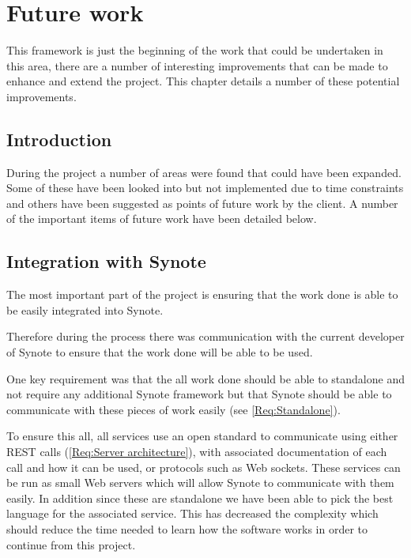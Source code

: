 \chapter{Future work} \label{Chapter: Future Work}

\begin{preamble}
This framework is just the beginning of the work that could be undertaken in this area, there are a number of interesting improvements that can be made to enhance and extend the project. This chapter details a number of these potential improvements.
\end{preamble}

\section{Introduction}

During the project a number of areas were found that could have been expanded. Some of these have been looked into but not implemented due to time constraints and others have been suggested as points of future work by the client. A number of the important items of future work have been detailed below.

\section{Integration with Synote}

The most important part of the project is ensuring that the work done is able to be easily integrated into Synote.

Therefore during the process there was communication with the current developer of Synote to ensure that the work done will be able to be used.

One key requirement was that the all work done should be able to standalone and not require any additional Synote framework but that Synote should be able to communicate with these pieces of work easily (see \cref{Req:Standalone}).

To ensure this all, all services use an open standard to communicate using either \gls{REST} calls (\cref{Req:Server architecture}), with associated documentation of each call and how it can be used, or protocols such as Web sockets. These services can be run as small Web servers which will allow Synote to communicate with them easily. In addition since these are standalone we have been able to pick the best language for the associated service. This has decreased the complexity which should reduce the time needed to learn how the software works in order to continue from this project.

